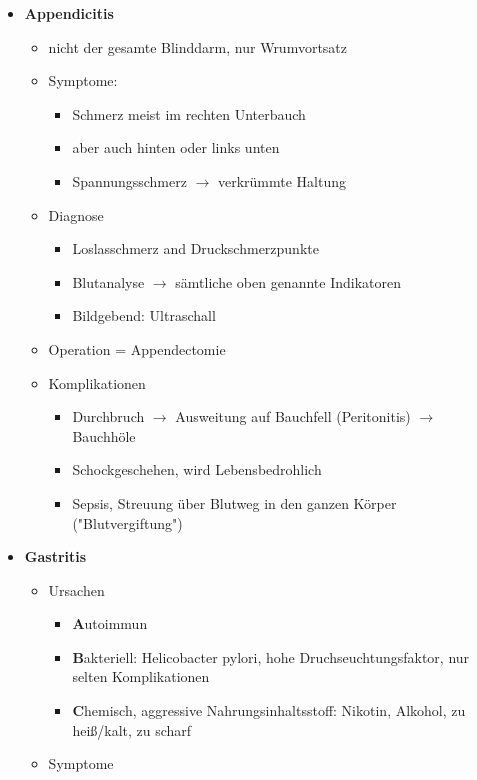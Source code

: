 \begin{itemize}
\begin{itemize}
	\pagebreak
			\item \textbf{Appendicitis}
				\begin{itemize}
					\item nicht der gesamte Blinddarm, nur Wrumvortsatz
					\item Symptome:
						\begin{itemize}
						 	\item Schmerz meist im rechten Unterbauch
						 	\item aber auch hinten oder links unten
						 	\item Spannungsschmerz $\rightarrow$ verkrümmte Haltung
						 \end{itemize}
					\item Diagnose
						\begin{itemize}
							\item Loslasschmerz and Druckschmerzpunkte
							\item Blutanalyse $\rightarrow$ sämtliche oben genannte Indikatoren
							\item Bildgebend: Ultraschall
						\end{itemize}
					\item Operation = Appendectomie
					\item Komplikationen
					\begin{itemize}
						\item Durchbruch $\rightarrow$ Ausweitung auf Bauchfell (Peritonitis) $\rightarrow$ Bauchhöle 
						\item Schockgeschehen, wird Lebensbedrohlich
						\item Sepsis, Streuung über Blutweg in den ganzen Körper ("Blutvergiftung")
					\end{itemize}
				\end{itemize}
			\item \textbf{Gastritis}
				\begin{itemize}
					\item Ursachen
						\begin{itemize}
							\item \textbf{A}utoimmun
							\item \textbf{B}akteriell: Helicobacter pylori, hohe Druchseuchtungsfaktor, nur selten Komplikationen
							\item \textbf{C}hemisch, aggressive Nahrungsinhaltsstoff: Nikotin, Alkohol, zu heiß/kalt, zu scharf
						\end{itemize}
					\item Symptome
						\begin{itemize}

\end{itemize}
\end{itemize}
\end{itemize}
\end{itemize}
